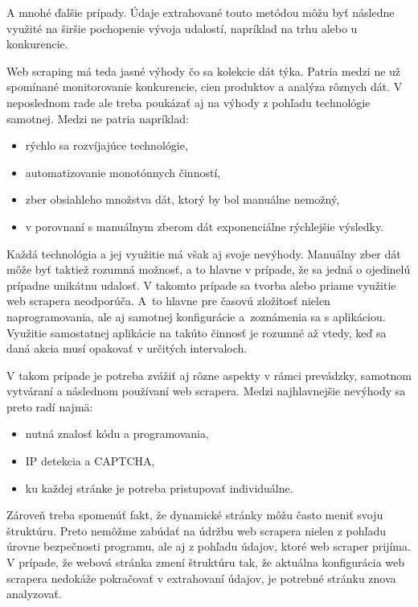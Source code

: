 A mnohé ďalšie prípady. Údaje extrahované touto metódou môžu byť následne využité na širšie pochopenie vývoja udalostí, napríklad na trhu alebo u konkurencie.

Web scraping má teda jasné výhody čo sa kolekcie dát týka. Patria medzi ne už spomínané monitorovanie konkurencie, cien produktov a analýza rôznych dát. V neposlednom rade ale treba poukázať aj na výhody z pohľadu technológie samotnej. Medzi ne patria napríklad:

\begin{itemize}
    \item rýchlo sa rozvíjajúce technológie,
    \item automatizovanie monotónnych činností,
    \item zber obsiahleho množstva dát, ktorý by bol manuálne nemožný,
    \item v porovnaní s manuálnym zberom dát exponenciálne rýchlejšie výsledky.
\end{itemize}

Každá technológia a jej využitie má však aj svoje nevýhody. Manuálny zber dát môže byť taktiež rozumná možnosť, a to hlavne v prípade, že sa jedná o ojedinelú prípadne unikátnu udalosť. V takomto prípade sa tvorba alebo priame využitie web scrapera neodporúča. A~to hlavne pre časovú zložitosť nielen naprogramovania, ale aj samotnej konfigurácie a~zoznámenia sa s aplikáciou. Využitie samostatnej aplikácie na takúto činnosť je rozumné až vtedy, keď sa daná akcia musí opakovať v určitých intervaloch. 

V takom prípade je potreba zvážiť aj rôzne aspekty v rámci prevádzky, samotnom vytváraní a následnom používaní web scrapera. Medzi najhlavnejšie nevýhody sa preto radí najmä:

\begin{itemize}
    \item nutná znalosť kódu a programovania,
    \item IP detekcia a CAPTCHA,
    \item ku každej stránke je potreba pristupovať individuálne.
\end{itemize}

Zároveň treba spomenúť fakt, že dynamické stránky môžu často meniť svoju štruktúru. Preto nemôžme zabúdať na údržbu web scrapera nielen z pohľadu úrovne bezpečnosti programu, ale aj z pohľadu údajov, ktoré web scraper prijíma. V prípade, že webová stránka zmení štruktúru tak, že aktuálna konfigurácia web scrapera nedokáže pokračovať v extrahovaní údajov, je potrebné stránku znova analyzovať. 

